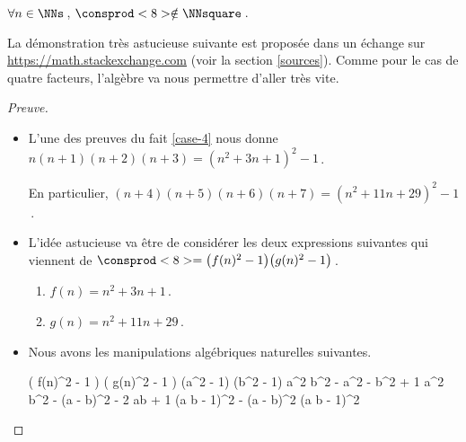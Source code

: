 \begin{fact} \label{case-8}
	 $\forall n \in \NNs$\,, $\consprod<8> \notin \NNsquare$\,.
\end{fact}




La démonstration très astucieuse suivante est proposée dans un échange sur \url{https://math.stackexchange.com} (voir la section \ref{sources}).
Comme pour le cas de quatre facteurs, l'algèbre va nous permettre d'aller très vite.


\begin{proof}[Preuve]
	\leavevmode

	\begin{itemize}
		\item L'une des preuves du fait \ref{case-4} nous donne
		$n (n + 1) (n + 2) (n + 3) = (n^2 + 3n + 1)^2 - 1$\,.

		\smallskip
		\noindent
		En particulier,
		$(n + 4)(n + 5)(n + 6)(n + 7) = (n^2 + 11 n + 29)^2 - 1$\,.


		\item L'idée astucieuse va être de considérer les deux expressions suivantes qui viennent de $\consprod<8> = \big( f(n)^2 - 1 \big) \big( g(n)^2 - 1 \big)$\,.
		\begin{enumerate}
			\item $f(n) = n^2 + 3n + 1$\,.

			\item $g(n) = n^2 + 11 n + 29$\,.
		\end{enumerate}


		\item Nous avons les manipulations algébriques naturelles suivantes.

        \noindent\kern-6pt%
        \begin{stepcalc}[style = sar]
        \explnext{}
        	\big( f(n)^2 - 1 \big) \big( g(n)^2 - 1 \big)
        	(a^2 - 1) (b^2 - 1)
        \explnext{}
        	a^2 b^2 - a^2 - b^2 + 1
        	a^2 b^2 - (a - b)^2 - 2 ab + 1
        \explnext{}
        	(a b  - 1)^2 - (a - b)^2
        	(a b  - 1)^2
        \end{stepcalc}
        
        \medskip
        

\end{itemize}
\end{proof}
